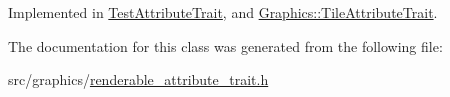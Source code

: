 Implemented in \hyperlink{class_test_attribute_trait_af121ef5fbd5bcda4bbbc7fdadd5599c8}{Test\+Attribute\+Trait}, and \hyperlink{class_graphics_1_1_tile_attribute_trait_a5c217a080f9b52799ad6c9e2ffaa06f5}{Graphics\+::\+Tile\+Attribute\+Trait}.



The documentation for this class was generated from the following file\+:\begin{DoxyCompactItemize}
\item 
src/graphics/\hyperlink{renderable__attribute__trait_8h}{renderable\+\_\+attribute\+\_\+trait.\+h}\end{DoxyCompactItemize}
